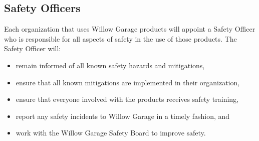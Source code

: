 \subsection{Safety Officers}

Each organization that uses Willow Garage products will appoint a Safety Officer who is responsible for all aspects of safety in the use of those products. The Safety Officer will:
\begin{itemize}
\item remain informed of all known safety hazards and mitigations,
\item ensure that all known mitigations are implemented in their organization,
\item ensure that everyone involved with the products receives safety training,
\item report any safety incidents to Willow Garage in a timely fashion, and
\item work with the Willow Garage Safety Board to improve safety.
\end{itemize}
